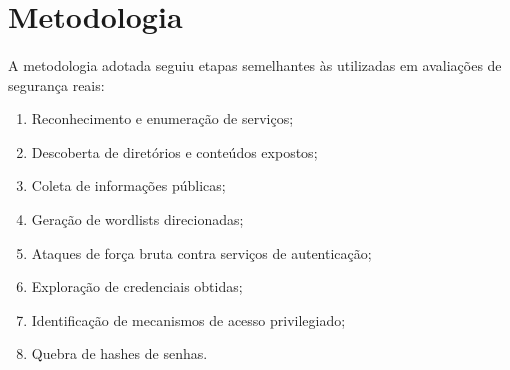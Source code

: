 \section{Metodologia}

\paragraph{}
A metodologia adotada seguiu etapas semelhantes às utilizadas em avaliações de
segurança reais:

\begin{enumerate}
  \item Reconhecimento e enumeração de serviços;
  \item Descoberta de diretórios e conteúdos expostos;
  \item Coleta de informações públicas;
  \item Geração de wordlists direcionadas;
  \item Ataques de força bruta contra serviços de autenticação;
  \item Exploração de credenciais obtidas;
  \item Identificação de mecanismos de acesso privilegiado;
  \item Quebra de hashes de senhas.
\end{enumerate}
